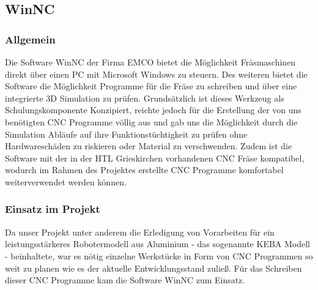 \subsection{WinNC}
\subsubsection{Allgemein}
Die Software WinNC der Firma EMCO bietet die Möglichkeit Fräsmaschinen direkt über einen PC mit Microsoft Windows zu steuern. Des weiteren bietet die Software die Möglichkeit Programme für die Fräse zu schreiben und über eine integrierte 3D Simulation zu prüfen. Grundsätzlich ist dieses Werkzeug als Schulungskomponente Konzipiert, reichte jedoch für die Erstellung der von uns benötigten CNC Programme völlig aus und gab uns die Möglichkeit durch die Simulation Abläufe auf ihre Funktionstüchtigkeit zu prüfen ohne Hardwareschäden zu riskieren oder Material zu verschwenden.
Zudem ist die Software mit der in der HTL Grieskirchen vorhandenen CNC Fräse kompatibel, wodurch im Rahmen des Projektes erstellte CNC Programme komfortabel weiterverwendet werden können.

\subsubsection{Einsatz im Projekt}
Da unser Projekt unter anderem die Erledigung von Vorarbeiten für ein leistungsstärkeres Robotermodell aus Aluminium - das sogenannte KEBA Modell - beinhaltete, war es nötig einzelne Werkstücke in Form von CNC Programmen so weit zu planen wie es der aktuelle Entwicklungsstand zuließ. Für das Schreiben dieser CNC Programme kam die Software WinNC zum Einsatz.